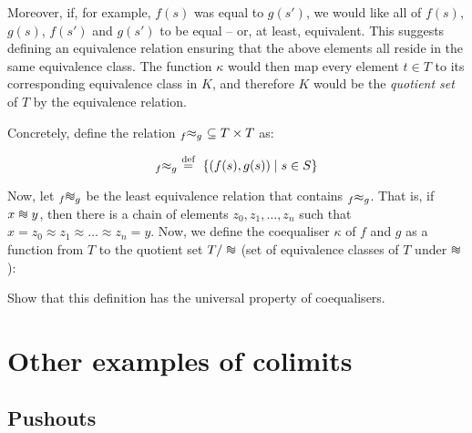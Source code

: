 Moreover, if, for example, $f(s)$ was equal to $g(s')$, we would like all of $f(s)$, $g(s)$, $f(s')$ and $g(s')$ to be equal -- or, at least, equivalent. This suggests defining an equivalence relation ensuring that the above elements all reside in the same equivalence class. The function $\kappa$ would then map every element $t \in T$ to its corresponding equivalence class in $K$, and therefore $K$ would be the \emph{quotient set} of $T$ by the equivalence relation.

Concretely, define the relation $ {}_{f}\hspace{-3px}\approx_{g}\ \subseteq T \times T$ as:

\begin{equation*}
    {}_{f}\hspace{-3px}\approx_{g}\ \eqdef\ \{(f(s), g(s)) \suchthat s \in S\}
\end{equation*}

Now, let ${}_{f}\hspace{-3px}\threesim_{g}$ be the least equivalence relation that contains ${}_{f}\hspace{-3px}\approx_{g}$. That is, if $x \threesim y$, then there is a chain of elements $z_0, z_1, \ldots, z_n$ such that $x = z_0 \approx z_1 \approx \ldots \approx z_n = y$. Now, we define the coequaliser $\kappa$ of $f$ and $g$ as a function from $T$ to the quotient set $T / \threesim$ (set of equivalence classes of $T$ under $\threesim$):

\begin{center}
\end{center}

\begin{exercise}
    Show that this definition has the universal property of coequalisers.
\end{exercise}

\section{Other examples of colimits}

\subsection{Pushouts}

